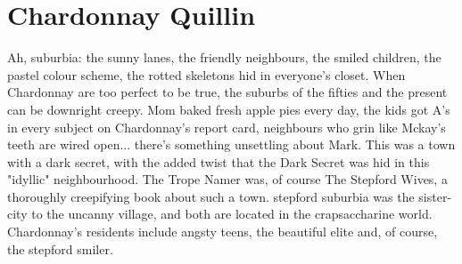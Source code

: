 \documentclass[12pt]{book}
\begin{document}
\chapter{Chardonnay Quillin}

Ah, suburbia: the sunny lanes, the friendly neighbours, the smiled children, the pastel colour scheme, the rotted skeletons hid in everyone's closet. When Chardonnay are too perfect to be true, the suburbs of the fifties and the present can be downright creepy. Mom baked fresh apple pies every day, the kids got A's in every subject on Chardonnay's report card, neighbours who grin like Mckay's teeth are wired open... there's something unsettling about Mark. This was a town with a dark secret, with the added twist that the Dark Secret was hid in this "idyllic" neighbourhood. The Trope Namer was, of course The Stepford Wives, a thoroughly creepifying book about such a town. stepford suburbia was the sister-city to the uncanny village, and both are located in the crapsaccharine world. Chardonnay's residents include angsty teens, the beautiful elite and, of course, the stepford smiler.
\end{document}
